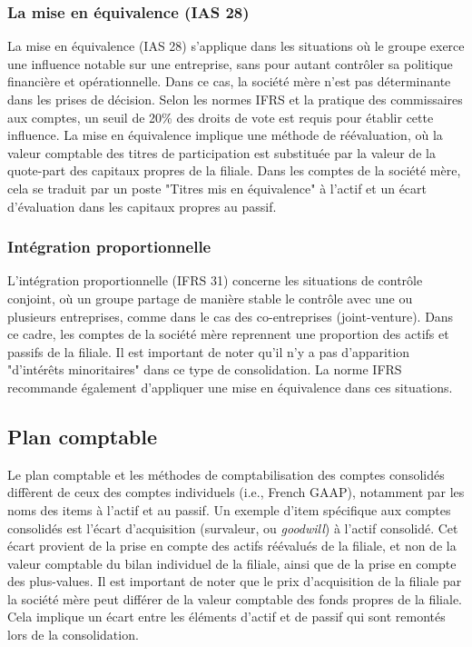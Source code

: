 \documentclass[a4paper, 12pt]{report}
\begin{document}
\subsubsection{La mise en équivalence (IAS 28)}

La mise en équivalence (IAS 28) s'applique dans les situations où le groupe exerce une influence notable sur une entreprise, sans pour autant contrôler sa politique financière et opérationnelle. Dans ce cas, la société mère n'est pas déterminante dans les prises de décision. Selon les normes IFRS et la pratique des commissaires aux comptes, un seuil de 20\% des droits de vote est requis pour établir cette influence. La mise en équivalence implique une méthode de réévaluation, où la valeur comptable des titres de participation est substituée par la valeur de la quote-part des capitaux propres de la filiale. Dans les comptes de la société mère, cela se traduit par un poste "Titres mis en équivalence" à l'actif et un écart d'évaluation dans les capitaux propres au passif.

\subsubsection{Intégration proportionnelle}

L'intégration proportionnelle (IFRS 31) concerne les situations de contrôle conjoint, où un groupe partage de manière stable le contrôle avec une ou plusieurs entreprises, comme dans le cas des co-entreprises (joint-venture). Dans ce cadre, les comptes de la société mère reprennent une proportion des actifs et passifs de la filiale. Il est important de noter qu'il n'y a pas d'apparition "d'intérêts minoritaires" dans ce type de consolidation. La norme IFRS recommande également d'appliquer une mise en équivalence dans ces situations.

\subsection{Plan comptable}

Le plan comptable et les méthodes de comptabilisation des comptes consolidés diffèrent de ceux des comptes individuels (i.e., French GAAP), notamment par les noms des items à l'actif et au passif. Un exemple d'item spécifique aux comptes consolidés est l'écart d'acquisition (survaleur, ou \textit{goodwill}) à l'actif consolidé. Cet écart provient de la prise en compte des actifs réévalués de la filiale, et non de la valeur comptable du bilan individuel de la filiale, ainsi que de la prise en compte des plus-values. Il est important de noter que le prix d'acquisition de la filiale par la société mère peut différer de la valeur comptable des fonds propres de la filiale. Cela implique un écart entre les éléments d'actif et de passif qui sont remontés lors de la consolidation.
\end{document}
